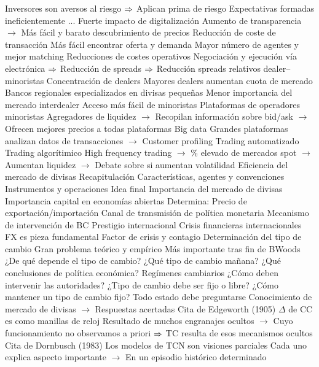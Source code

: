 \documentclass{nuevotema}
\begin{document}
\begin{esquemal}
				\4[] Inversores son aversos al riesgo
				\4[] $\then$ Aplican prima de riesgo
				\4[] Expectativas formadas ineficientemente
				\4[] ...
			\3 Fuerte impacto de digitalización
				\4 Aumento de transparencia
				\4[] $\to$ Más fácil y barato descubrimiento de precios
				\4 Reducción de coste de transacción
				\4[] Más fácil encontrar oferta y demanda
				\4 Mayor número de agentes y mejor matching
				\4[] Reducciones de costes operativos
				\4[] Negociación y ejecución vía electrónica
				\4[] $\then$ Reducción de spreads
				\4[] $\then$ Reducción spreads relativos dealer--minoristas
				\4 Concentración de dealers
				\4[] Mayores dealers aumentan cuota de mercado
				\4[] Bancos regionales especializados en divisas pequeñas
				\4 Menor importancia del mercado interdealer
				\4[] Acceso más fácil de minoristas
				\4[] Plataformas de operadores minoristas
				\4[] Agregadores de liquidez
				\4[] $\to$ Recopilan información sobre bid/ask
				\4[] $\to$ Ofrecen mejores precios a todas plataformas
				\4 Big data
				\4[] Grandes plataformas analizan datos de transacciones
				\4[] $\to$ Customer profiling
				\4 Trading automatizado
				\4[] Trading algorítimico
				\4[] High frequency trading
				\4[] $\to$ \% elevado de mercados spot
				\4[] $\to$ Aumentan liquidez
				\4[] $\to$ Debate sobre si aumentan volatilidad
		\2 Eficiencia del mercado de divisas
	\1[] 
		\2 Recapitulación
			\3 Características, agentes y convenciones
			\3 Instrumentos y operaciones
		\2 Idea final
			\3 Importancia del mercado de divisas
				\4 Importancia capital en economías abiertas
				\4 Determina:
				\4[] Precio de exportación/importación
				\4 Canal de transmisión de política monetaria
				\4[] Mecanismo de intervención de BC
				\4 Prestigio internacional
				\4 Crisis financieras internacionales
				\4[] FX es pieza fundamental
				\4[] Factor de crisis y contagio
			\3 Determinación del tipo de cambio
				\4 Gran problema teórico y empírico
				\4[] Más importante tras fin de BWoods
				\4[] ¿De qué depende el tipo de cambio?
				\4[] ¿Qué tipo de cambio mañana?
				\4[] ¿Qué conclusiones de política económica?
			\3 Regímenes cambiarios
				\4 ¿Cómo deben intervenir las autoridades?
				\4 ¿Tipo de cambio debe ser fijo o libre?
				\4 ¿Cómo mantener un tipo de cambio fijo?
				\4[$\then$] Todo estado debe preguntarse
				\4[] Conocimiento de mercado de divisas
				\4[] $\to$ Respuestas acertadas
			\3 Cita de Edgeworth (1905)
				\4 $\Delta$ de CC es como manillas de reloj
				\4[] Resultado de muchos engranajes ocultos
				\4[] $\to$ Cuyo funcionamiento no observamos a priori
				\4[] $\then$ TC resulta de esos mecanismos ocultos
			\3 Cita de Dornbusch (1983)
				\4 Los modelos de TCN son visiones parciales
				\4[] Cada uno explica aspecto importante
				\4[] $\to$ En un episodio histórico determinado
\end{esquemal}			
\end{document}
